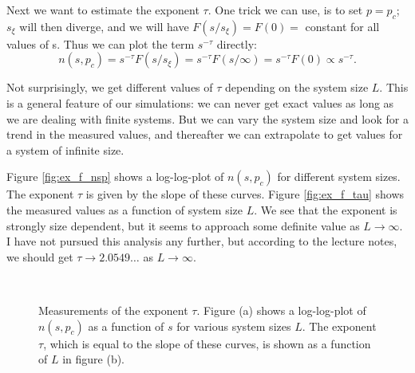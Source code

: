 \documentclass[12pt]{article}
\newcommand{\bdi}{\begin{displaymath}}
\newcommand{\edi}{\end{displaymath}}
\begin{document}
Next we want to estimate the exponent $\tau$. One trick we can use, is to set $p=p_c$; $s_\xi$ will then diverge, and we will have $F(s/s_\xi) = F(0) =$ constant for all values of s.
Thus we can plot the term $s^{-\tau}$ directly:
\bdi
n(s,p_c) = s^{-\tau}F(s/s_\xi) = s^{-\tau}F(s/\infty) = s^{-\tau}F(0) \propto s^{-\tau}.
\edi

Not surprisingly, we get different values of $\tau$ depending on the system size $L$. This is a general feature of our simulations:
we can never get exact values as long as we are dealing with finite systems. But we can vary the system size and look for a trend in the measured values, and thereafter we can extrapolate
to get values for a system of infinite size.

Figure \ref{fig:ex_f_nsp} shows a log-log-plot of $n(s,p_c)$ for different system sizes. The exponent $\tau$ is given by the slope of these curves. Figure \ref{fig:ex_f_tau} shows the measured values
as a function of system size $L$. We see that the exponent is strongly size dependent, but it seems to approach some definite value as $L\rightarrow\infty$. I have not pursued this analysis any further, but 
according to the lecture notes, we should get $\tau\rightarrow2.0549\dots$ as $L\rightarrow\infty$.


\begin{figure}[!ht]
    \begin{center}
        \hspace{5mm}
        \\ 
    \end{center}
    \caption{Measurements of the exponent $\tau$. Figure (a) shows a log-log-plot of $n(s,p_c)$ as a function of $s$ for various system sizes $L$. The exponent $\tau$, which is equal to the slope of
             these curves, is shown as a function of $L$ in figure (b).}
    \label{fig:ex_f}
\end{figure}
\end{document}
